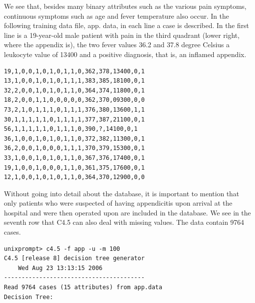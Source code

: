 \documentclass[10pt]{book}
\begin{document}
We see that, besides many binary attributes such as the various pain symptoms, continuous symptoms such as age and fever temperature also occur. In the following training data file, app. data, in each line a case is described. In the first line is a 19-year-old male patient with pain in the third quadrant (lower right, where the appendix is), the two fever values 36.2 and 37.8 degree Celsius a leukocyte value of 13400 and a positive diagnosis, that is, an inflamed appendix.

\begin{verbatim}
19,1,0,0,1,0,1,0,1,1,0,362,378,13400,0,1
13,1,0,0,1,0,1,0,1,1,1,383,385,18100,0,1
32,2,0,0,1,0,1,0,1,1,0,364,374,11800,0,1
18,2,0,0,1,1,0,0,0,0,0,362,370,09300,0,0
73,2,1,0,1,1,1,0,1,1,1,376,380,13600,1,1
30,1,1,1,1,1,0,1,1,1,1,377,387,21100,0,1
56,1,1,1,1,1,0,1,1,1,0,390,?,14100,0,1
36,1,0,0,1,0,1,0,1,1,0,372,382,11300,0,1
36,2,0,0,1,0,0,0,1,1,1,370,379,15300,0,1
33,1,0,0,1,0,1,0,1,1,0,367,376,17400,0,1
19,1,0,0,1,0,0,0,1,1,0,361,375,17600,0,1
12,1,0,0,1,0,1,0,1,1,0,364,370,12900,0,0
\end{verbatim}

Without going into detail about the database, it is important to mention that only patients who were suspected of having appendicitis upon arrival at the hospital and were then operated upon are included in the database. We see in the seventh row that C4.5 can also deal with missing values. The data contain 9764 cases.

\begin{verbatim}
unixprompt> c4.5 -f app -u -m 100
C4.5 [release 8] decision tree generator
    Wed Aug 23 13:13:15 2006
----------------------------------------
Read 9764 cases (15 attributes) from app.data
Decision Tree:
\end{verbatim}
\end{document}
